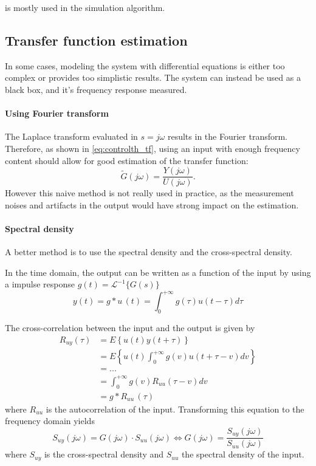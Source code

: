  is mostly used in the simulation algorithm.

\subsection{Transfer function estimation}
In some cases, modeling the system with differential equations is either too complex or provides too simplistic results. The system can instead be used as a black box, and it's frequency response measured.

\paragraph{Using Fourier transform}
The Laplace transform evaluated in $s=j\omega$ results in the Fourier transform. Therefore, as shown in \cref{eq:controlth_tf}, using an input with enough frequency content should allow for good estimation of the transfer function:
\begin{equation}
	\tilde{G}(j\omega) = \frac{Y(j\omega)}{U(j\omega)}.
\end{equation}
However this naive method is not really used in practice, as the measurement noises and artifacts in the output would have strong impact on the estimation.

\paragraph{Spectral density}
A better method is to use the spectral density and the cross-spectral density.

In the time domain, the output can be written as a function of the input by using a impulse response $g(t) = \mathcal{L}^{-1}\{G(s)\}$
\begin{equation}
	y(t) = g * u\,(t) =  \int_0^{+\infty} g(\tau) u(t-\tau)d\tau
\end{equation}

The cross-correlation between the input and the output is given by
\begin{align}
R_{uy}(\tau) &= E \left\{ u(t) y(t+\tau)\right\} \nonumber\\
			 &= E \left\{ u(t) \int_0^{+\infty} g(v) u(t+\tau-v)dv\right\} \nonumber\\
			 &= ... \nonumber \\ 
			 &= \int_0^{+\infty} g(v) R_{uu}(\tau-v) dv \nonumber\\
			 &= g * R_{uu} \, (\tau)
\end{align}
where $R_{uu}$ is the autocorrelation of the input. Transforming this equation to the frequency domain yields
\begin{equation}
	S_{uy}(j\omega) = G(j\omega)\cdot S_{uu}(j\omega)   \iff 	G(j\omega) = \frac{S_{uy}(j\omega) }{ S_{uu}(j\omega)}
\end{equation}
where $S_{uy}$ is the cross-spectral density and $S_{uu}$ the spectral density of the input.

